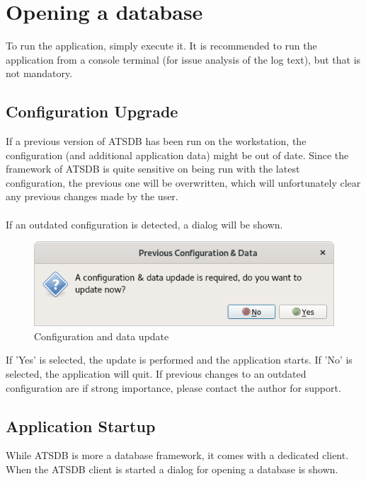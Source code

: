 \section{Opening a database}

To run the application, simply execute it. It is recommended to run the application from a console terminal (for issue analysis of the log text), but that is not mandatory.

\subsection{Configuration Upgrade}

If a previous version of ATSDB has been run on the workstation, the configuration (and additional application data) might be out of date. Since the framework of ATSDB is quite sensitive on being run with the latest configuration, the previous one will be overwritten, which will unfortunately clear any previous changes made by the user. \\\\

If an outdated configuration is detected, a dialog will be shown.

\begin{figure}[H]
    \includegraphics[width=12cm,frame]{../screenshots/config_data_update.png}
  \caption{Configuration and data update}
  \label{fig:db_connect}
\end{figure}

If 'Yes' is selected, the update is performed and the application starts. If 'No' is selected, the application will quit. If previous changes to an outdated configuration are if strong importance, please contact the author for support.

\subsection{Application Startup}
\label{sec:startup}

While ATSDB is more a database framework, it comes with a dedicated client. When the ATSDB client is started a dialog  for opening a database is shown. 

